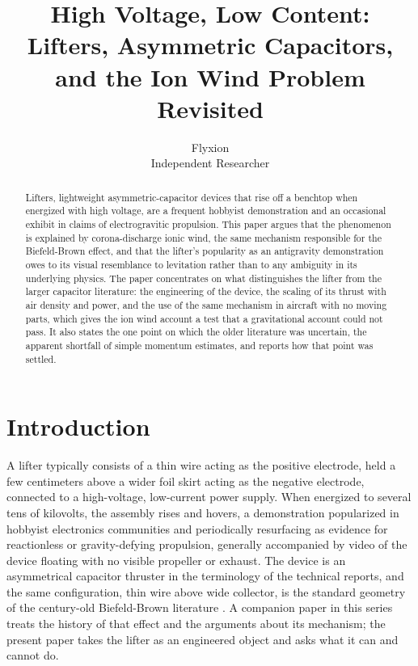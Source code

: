 \documentclass[11pt]{article}
\title{High Voltage, Low Content: Lifters, Asymmetric Capacitors, and the Ion Wind Problem Revisited}
\author{Flyxion \\ \small Independent Researcher}
\date{}
\begin{document}
\maketitle

\begin{abstract}
Lifters, lightweight asymmetric-capacitor devices that rise off a benchtop when energized with high voltage, are a frequent hobbyist demonstration and an occasional exhibit in claims of electrogravitic propulsion. This paper argues that the phenomenon is explained by corona-discharge ionic wind, the same mechanism responsible for the Biefeld-Brown effect, and that the lifter's popularity as an antigravity demonstration owes to its visual resemblance to levitation rather than to any ambiguity in its underlying physics. The paper concentrates on what distinguishes the lifter from the larger capacitor literature: the engineering of the device, the scaling of its thrust with air density and power, and the use of the same mechanism in aircraft with no moving parts, which gives the ion wind account a test that a gravitational account could not pass. It also states the one point on which the older literature was uncertain, the apparent shortfall of simple momentum estimates, and reports how that point was settled.
\end{abstract}

\section{Introduction}

A lifter typically consists of a thin wire acting as the positive electrode, held a few centimeters above a wider foil skirt acting as the negative electrode, connected to a high-voltage, low-current power supply. When energized to several tens of kilovolts, the assembly rises and hovers, a demonstration popularized in hobbyist electronics communities and periodically resurfacing as evidence for reactionless or gravity-defying propulsion, generally accompanied by video of the device floating with no visible propeller or exhaust. The device is an asymmetrical capacitor thruster in the terminology of the technical reports, and the same configuration, thin wire above wide collector, is the standard geometry of the century-old Biefeld-Brown literature \cite{CMW2004}. A companion paper in this series treats the history of that effect and the arguments about its mechanism; the present paper takes the lifter as an engineered object and asks what it can and cannot do.
\end{document}
